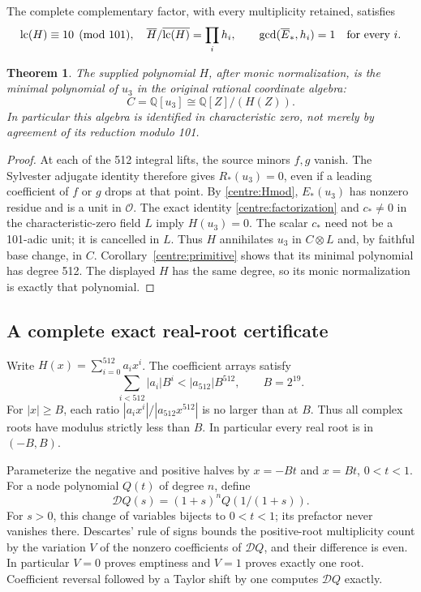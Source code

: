 \documentclass[11pt,a4paper]{article}
\newtheorem{theorem}{Theorem}[section]
\theoremstyle{remark}\newtheorem{remark}[theorem]{Remark}
\begin{document}
The complete complementary factor, with every multiplicity retained,
satisfies
\begin{equation}\label{centre:Hmod}
 \operatorname{lc}(H)\equiv10\pmod {101},\quad
 \overline H/\overline{\operatorname{lc}(H)}=\prod_i h_i,
 \qquad \gcd(\overline E_*,h_i)=1\quad\hbox{for every }i.
\end{equation}
\begin{theorem}\label{centre:coordinate}
The supplied polynomial $H$, after monic normalization, is the minimal
polynomial of $u_3$ in the original rational coordinate algebra:
\[
 C=\mathbb Q[u_3]\cong\mathbb Q[Z]/(H(Z)).
\]
In particular this algebra is identified in characteristic zero, not
merely by agreement of its reduction modulo 101.
\end{theorem}
\begin{proof}
At each of the 512 integral lifts, the source minors $f,g$ vanish.
The Sylvester adjugate identity therefore gives $R_*(u_3)=0$, even if
a leading coefficient of $f$ or $g$ drops at that point. By
\eqref{centre:Hmod}, $E_*(u_3)$ has nonzero residue and is a unit in
$\mathcal O$. The exact identity \eqref{centre:factorization} and
$c_*\ne0$ in the characteristic-zero field $L$ imply $H(u_3)=0$.
The scalar $c_*$ need not be a 101-adic unit; it is cancelled in $L$.
Thus $H$ annihilates $u_3$ in $C\otimes L$ and, by faithful base
change, in $C$. Corollary~\ref{centre:primitive} shows that its minimal
polynomial has degree 512. The displayed $H$ has the same degree, so
its monic normalization is exactly that polynomial.
\end{proof}

\subsection{A complete exact real-root certificate}
Write $H(x)=\sum_{i=0}^{512}a_ix^i$. The coefficient arrays satisfy
\[
 \sum_{i<512}|a_i|B^i<|a_{512}|B^{512},\qquad B=2^{19}.
\]
For $|x|\ge B$, each ratio $|a_ix^i|/|a_{512}x^{512}|$ is no larger
than at $B$. Thus all complex roots have modulus strictly less than
$B$. In particular every real root is in $(-B,B)$.

Parameterize the negative and positive halves by $x=-Bt$ and $x=Bt$,
$0<t<1$. For a node polynomial $Q(t)$ of degree $n$, define
\[
 \mathcal DQ(s)=(1+s)^nQ(1/(1+s)).
\]
For $s>0$, this change of variables bijects to $0<t<1$; its prefactor
never vanishes there. Descartes' rule of signs bounds the positive-root
multiplicity count by the variation $V$ of the nonzero coefficients
of $\mathcal DQ$, and their difference is even. In particular $V=0$
proves emptiness and $V=1$ proves exactly one root. Coefficient reversal
followed by a Taylor shift by one computes $\mathcal DQ$ exactly.
\end{document}
